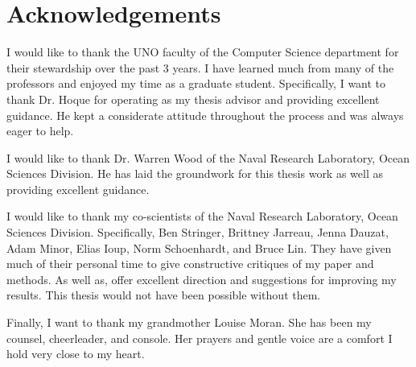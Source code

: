 \setcounter{secnumdepth}{0}
\section*{Acknowledgements}
I would like to thank the UNO faculty of the Computer Science department for their stewardship over the past 3 years.
I have learned much from many of the professors and enjoyed my time as a graduate student.
Specifically, I want to thank Dr. Hoque for operating as my thesis advisor and providing excellent guidance.
He kept a considerate attitude throughout the process and was always eager to help.

I would like to thank Dr. Warren Wood of the Naval Research Laboratory, Ocean Sciences Division.
He has laid the groundwork for this thesis work as well as providing excellent guidance.

I would like to thank my co-scientists of the Naval Research Laboratory, Ocean Sciences Division. Specifically, Ben Stringer, Brittney Jarreau, Jenna Dauzat, Adam Minor, Elias Ioup, Norm Schoenhardt, and Bruce Lin.
They have given much of their personal time to give constructive critiques of my paper and methods.
As well as, offer excellent direction and suggestions for improving my results.
This thesis would not have been possible without them.

Finally, I want to thank my grandmother Louise Moran. 
She has been my counsel, cheerleader, and console.
Her prayers and gentle voice are a comfort I hold very close to my heart.
